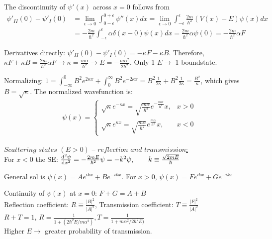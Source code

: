 The discontinuity of $\psi'(x)$ across $x=0$ follows from 
\begin{align*}
    \psi'_{II}(0) - \psi'_{I}(0) 
    &= \lim_{\epsilon \rightarrow 0} \int_{0-\epsilon}^{0+\epsilon} \psi''(x) dx = \lim_{\epsilon \rightarrow 0} \int_{-\epsilon}^{\epsilon} \frac{2m}{\hbar^2} (V(x) - E) \psi(x) dx \\
    &= - \frac{2m}{\hbar^2} \int_{-\epsilon}^{\epsilon} \alpha \delta(x-0) \psi(x) dx = \frac{2m}{\hbar^2} \alpha \psi(0) = - \frac{2m}{\hbar^2} \alpha F
\end{align*}

Derivatives directly: $\psi'_{II}(0) - \psi'_{I}(0) = -\kappa F - \kappa B$. Therefore,
    $\kappa F + \kappa B = \frac{2m}{\hbar^2} \alpha F \rightarrow \kappa = \frac{m \alpha}{\hbar^2} \rightarrow E = - \frac{m \alpha^2}{2 \hbar^2}$. Only 1 $E \rightarrow$ 1 boundstate.

Normalizing: $1 = \int_{-\infty}^{0} B^2 e^{2 \kappa x} + \int_{0}^{\infty} B^2 e^{-2 \kappa x} = B^2 \frac{1}{2 \kappa} + B^2 \frac{1}{2 \kappa} = \frac{B^2}{\kappa}$, which gives $B = \sqrt{\kappa}$. 
The normalized wavefunction is: 
\begin{align*}
\psi(x) = 
    \begin{cases} 
        \sqrt{\kappa} e^{-\kappa x} = \sqrt{\frac{m\alpha}{\hbar^2}} e^{-\frac{m\alpha}{\hbar^2}} x, & x > 0 \\ 
        \sqrt{\kappa} e^{\kappa x} = \sqrt{\frac{m\alpha}{\hbar^2}} e^{\frac{m \alpha}{\hbar^2}} x, & x < 0
    \end{cases}
\end{align*}

\underline{$\textit{Scattering states } (E > 0) \textit{ -- reflection and transmission}$:} \\

For $x < 0$ the SE: $\dv[2]{\psi}{x} = -\frac{2mE}{\hbar^2} \psi = -k^2 \psi, \qquad k \equiv \frac{\sqrt{2mE}}{\hbar}$

General sol is $\psi(x) = Ae^{ikx} + Be^{-ikx}$.
For $x > 0$, $\psi(x) = Fe^{ikx} + Ge^{-ikx}$

Continuity of $\psi(x)$ at $x = 0$: $F+G=A+B$ \\

Reflection coefficient: $R \equiv \frac{|B|^2}{|A|^2}$, 
Transmission coefficient: $T \equiv \frac{|F|^2}{|A|^2}$ \\
$R + T = 1$, $R = \frac{1}{1+(2\hbar^2E/m \alpha^2)}, T = \frac{1}{1+m \alpha^2 / 2 \hbar^2 E)}$ \\
Higher $E \rightarrow$ greater probability of transmission.

